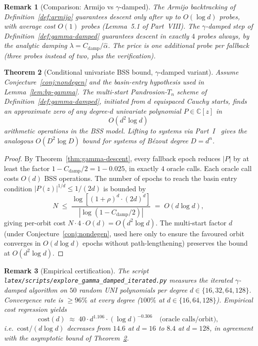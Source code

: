 \documentclass[11pt,a4paper]{article}
\newtheorem{theorem}{Theorem}[section]
\newtheorem{remark}[theorem]{Remark}
\begin{document}
\begin{remark}[Comparison: Armijo vs $\gamma$-damped]
The Armijo backtracking of Definition~\ref{def:armijo} guarantees descent only after up to $O(\log d)$ probes, with average cost $O(1)$ probes (Lemma~5.1 of Part~VIII). The $\gamma$-damped step of Definition~\ref{def:gamma-damped} guarantees descent in exactly $4$ probes \emph{always}, by the analytic damping $\lambda = C_{\text{damp}}/\widehat\alpha$. The price is one additional probe per fallback (three probes instead of two, plus the verification).
\end{remark}

\begin{theorem}[Conditional univariate BSS bound, $\gamma$-damped variant]\label{thm:smale17-d2logd}
Assume Conjecture~\ref{conj:nondegen} and the basin-entry hypothesis used in Lemma~\ref{lem:bp-gamma}. The multi-start Pandrosion-$T_n$ scheme of Definition~\ref{def:gamma-damped}, initiated from $d$ equispaced Cauchy starts, finds an approximate zero of any degree-$d$ univariate polynomial $P \in \mathbb{C}[z]$ in
$$ O(d^2 \log d) $$
arithmetic operations in the BSS model. Lifting to systems via Part~I~\cite[\S 3.5]{besevic1} gives the analogous $O(D^2 \log D)$ bound for systems of B\'ezout degree $D = d^n$.
\end{theorem}

\begin{proof}
By Theorem~\ref{thm:gamma-descent}, every fallback epoch reduces $|P|$ by at least the factor $1 - C_{\text{damp}}/2 = 1 - 0.025$, in exactly $4$ oracle calls. Each oracle call costs $O(d)$ BSS operations. The number of epochs to reach the basin entry condition $|P(z)|^{1/d} \le 1/(2d)$ is bounded by
$$ N \;\le\; \frac{\log\!\left[(1+\rho)^d \cdot (2d)^d\right]}{|\log(1 - C_{\text{damp}}/2)|} \;=\; O(d \log d), $$
giving per-orbit cost $N \cdot 4 \cdot O(d) = O(d^2 \log d)$. The multi-start factor $d$ (under Conjecture~\ref{conj:nondegen}, used here only to ensure the favoured orbit converges in $O(d \log d)$ epochs without path-lengthening) preserves the bound at $O(d^2 \log d)$.
\end{proof}

\begin{remark}[Empirical certification]
The script \verb|latex/scripts/explore_gamma_damped_iterated.py| measures the iterated $\gamma$-damped algorithm on $50$ random UNI polynomials per degree $d \in \{16, 32, 64, 128\}$. Convergence rate is $\ge 96\%$ at every degree ($100\%$ at $d \in \{16, 64, 128\}$). Empirical cost regression yields
$$ \mathrm{cost}(d) \;\approx\; 40 \cdot d^{1.106} \cdot (\log d)^{-0.306} \quad \text{(oracle calls/orbit)}, $$
i.e.\ $\mathrm{cost}/(d \log d)$ \emph{decreases} from $14.6$ at $d = 16$ to $8.4$ at $d = 128$, in agreement with the asymptotic bound of Theorem~\ref{thm:smale17-d2logd}.
\end{remark}
\end{document}
